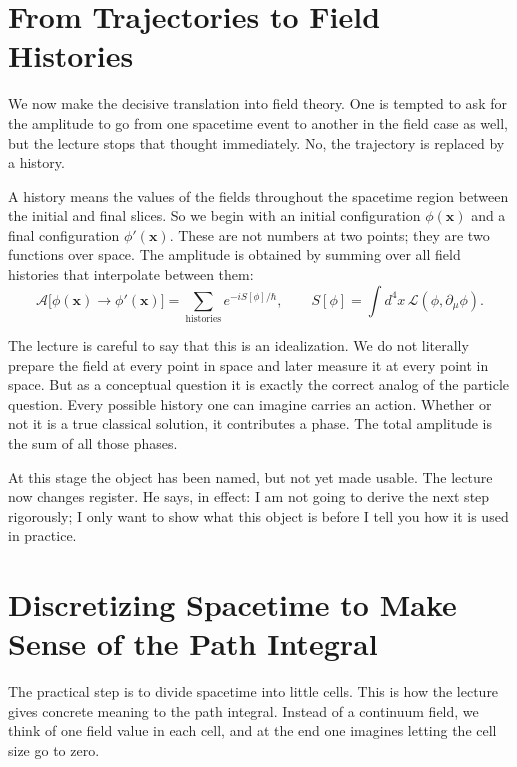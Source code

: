 \section{From Trajectories to Field Histories}

We now make the decisive translation into field theory. One is tempted to ask for the amplitude to go from one spacetime event to another in the field case as well, but the lecture stops that thought immediately. No, the trajectory is replaced by a history.

A history means the values of the fields throughout the spacetime region between the initial and final slices. So we begin with an initial configuration \(\phi(\mathbf{x})\) and a final configuration \(\phi'(\mathbf{x})\). These are not numbers at two points; they are two functions over space. The amplitude is obtained by summing over all field histories that interpolate between them:
\begin{equation}
\mathcal{A}\big[\phi(\mathbf{x})\to \phi'(\mathbf{x})\big]
=\sum_{\text{histories}} e^{-iS[\phi]/\hbar},
\qquad
S[\phi]=\int d^4x\,\mathcal{L}(\phi,\partial_\mu\phi).
\end{equation}

The lecture is careful to say that this is an idealization. We do not literally prepare the field at every point in space and later measure it at every point in space. But as a conceptual question it is exactly the correct analog of the particle question. Every possible history one can imagine carries an action. Whether or not it is a true classical solution, it contributes a phase. The total amplitude is the sum of all those phases.

At this stage the object has been named, but not yet made usable. The lecture now changes register. He says, in effect: I am not going to derive the next step rigorously; I only want to show what this object is before I tell you how it is used in practice.

\section{Discretizing Spacetime to Make Sense of the Path Integral}

The practical step is to divide spacetime into little cells. This is how the lecture gives concrete meaning to the path integral. Instead of a continuum field, we think of one field value in each cell, and at the end one imagines letting the cell size go to zero.

